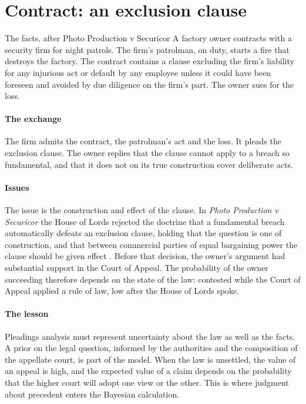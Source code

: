 \section{Contract: an exclusion clause}

\begin{casebox}{The facts, after Photo Production v Securicor}
A factory owner contracts with a security firm for night patrols. The firm's patrolman, on duty, starts a fire that destroys the factory. The contract contains a clause excluding the firm's liability for any injurious act or default by any employee unless it could have been foreseen and avoided by due diligence on the firm's part. The owner sues for the loss.
\end{casebox}

\paragraph{The exchange} The firm admits the contract, the patrolman's act and the loss. It pleads the exclusion clause. The owner replies that the clause cannot apply to a breach so fundamental, and that it does not on its true construction cover deliberate acts.

\paragraph{Issues} The issue is the construction and effect of the clause. In \emph{Photo Production v Securicor} the House of Lords rejected the doctrine that a fundamental breach automatically defeats an exclusion clause, holding that the question is one of construction, and that between commercial parties of equal bargaining power the clause should be given effect \citep{photo1980}. Before that decision, the owner's argument had substantial support in the Court of Appeal. The probability of the owner succeeding therefore depends on the state of the law: contested while the Court of Appeal applied a rule of law, low after the House of Lords spoke.

\paragraph{The lesson} Pleadings analysis must represent uncertainty about the law as well as the facts. A prior on the legal question, informed by the authorities and the composition of the appellate court, is part of the model. When the law is unsettled, the value of an appeal is high, and the expected value of a claim depends on the probability that the higher court will adopt one view or the other. This is where judgment about precedent enters the Bayesian calculation.

